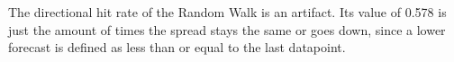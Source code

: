 The directional hit rate of the Random Walk is an artifact. Its value of 0.578 is just the amount of times the spread stays the same or goes down, since a lower forecast is defined as less than or equal to the last datapoint.
%

